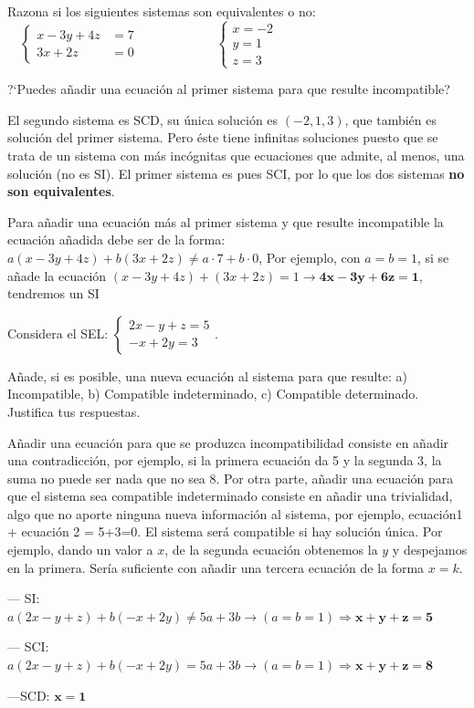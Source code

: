 \begin{ejre}
	Razona si los siguientes sistemas son equivalentes o no: $\quad \begin{cases}x-3y+4z&=7\\3x+2z&=0 \end{cases} \qquad \qquad \qquad  \begin{cases}x=-2\\y=1\\z=3 \end{cases}$
	
	\noindent ?`Puedes añadir una ecuación al primer sistema para que resulte incompatible?
\end{ejre}
\begin{proofw}\renewcommand{\qedsymbol}{$\diamond$}
	El segundo sistema es SCD, su única solución es $(-2,1,3)$, que también es solución del primer sistema. Pero éste tiene infinitas soluciones puesto que se trata de un sistema con más incógnitas que ecuaciones que admite, al menos, una solución (no es SI). El primer sistema es pues SCI, por lo que los dos sistemas \textbf{no son equivalentes}.
	
	Para añadir una ecuación más al primer sistema y que resulte incompatible la ecuación añadida debe ser de la forma: $a(x-3y+4z)+b(3x+2z)\neq a\cdot 7+b \cdot 0$, Por ejemplo, con $a=b=1$, si se añade la ecuación $(x-3y+4z)+(3x+2z)=1 \rightarrow \boldsymbol{4x-3y+6z=1}$, tendremos un SI
\end{proofw}

\begin{ejre}
Considera el SEL: $\begin{cases} 2x-y+z=5 \\ -x+2y=3  \end{cases}$.

Añade, si es posible, una nueva ecuación al sistema para que resulte:  a) Incompatible, b) Compatible indeterminado, c) Compatible determinado. Justifica tus respuestas.
\end{ejre}
\begin{proofw}\renewcommand{\qedsymbol}{$\diamond$}
	Añadir una ecuación para que se produzca incompatibilidad consiste en añadir una contradicción, por ejemplo, si la primera ecuación da 5 y la segunda 3, la suma no puede ser nada que no sea 8. Por otra parte, añadir una ecuación para que el sistema sea compatible indeterminado consiste en añadir una trivialidad, algo que no aporte ninguna nueva información al sistema, por ejemplo, ecuación1 + ecuación 2 = 5+3=0. El sistema será compatible si hay solución única. Por ejemplo, dando un valor a $x$, de la segunda ecuación obtenemos la $y$ y despejamos en la primera. Sería suficiente con añadir una tercera ecuación de la forma $x=k$.
	
	--- SI: $a(2x-y+z)+b(-x+2y)\neq 5a+3b \to (a=b=1) \Rightarrow \boldsymbol{x+y+z=5}$
	
	--- SCI:  $a(2x-y+z)+b(-x+2y)= 5a+3b \to (a=b=1) \Rightarrow \boldsymbol{x+y+z=8}$
	
	---SCD: $\boldsymbol{x=1}$
\end{proofw}

